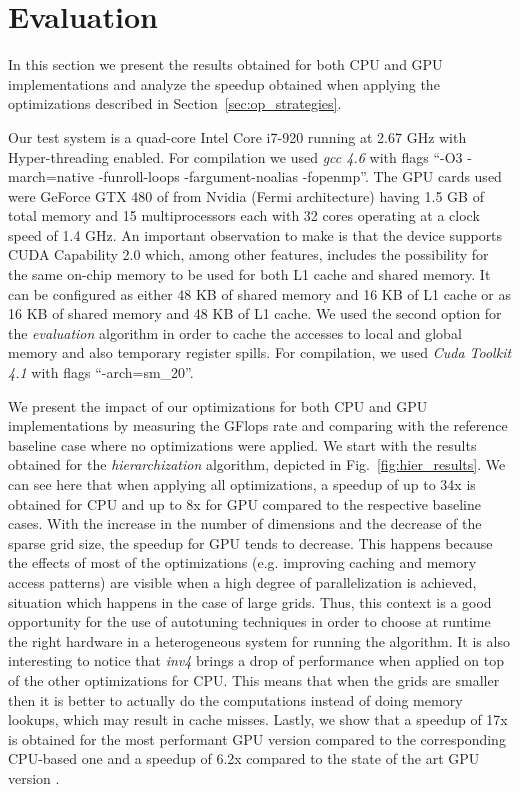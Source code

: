 \section{Evaluation}

In this section we present the results obtained for both CPU and GPU
implementations and analyze the speedup obtained when applying the
optimizations described in Section~\ref{sec:op_strategies}.

Our test system is a quad-core Intel Core i7-920 running at 2.67 GHz with
Hyper-threading enabled. For compilation we used \textit{gcc 4.6} with flags
``-O3 -march=native -funroll-loops -fargument-noalias -fopenmp''. The GPU cards
used were GeForce GTX 480 of from Nvidia (Fermi architecture) having 1.5 GB of
total memory and 15 multiprocessors each with 32 cores operating at a clock
speed of 1.4 GHz. An important observation to make is that the device supports
CUDA Capability 2.0 which, among other features, includes the possibility for
the same on-chip memory to be used for both L1 cache and shared memory. It can
be configured as either 48 KB of shared memory and 16 KB of L1 cache or as 16 KB
of shared memory and 48 KB of L1 cache. We used the second option for the
\textit{evaluation} algorithm in order to cache the accesses to local and global
memory and also temporary register spills. For compilation, we used
\textit{Cuda Toolkit 4.1} with flags ``-arch=sm\_20''.

We present the impact of our optimizations for both CPU and GPU implementations
by measuring the GFlops rate and comparing with the reference baseline case
where no optimizations were applied. We start with the results obtained for the
\textit{hierarchization} algorithm, depicted in Fig.~\ref{fig:hier_results}. We
can see here that when applying all optimizations, a speedup of up to 34x is
obtained for CPU and up to 8x for GPU compared to the respective baseline cases.
With the increase in the number of dimensions and the decrease of the sparse
grid size, the speedup for GPU tends to decrease. This happens because the
effects of most of the optimizations (e.g. improving caching and memory access
patterns) are visible when a high degree of parallelization is achieved,
situation which happens in the case of large grids. Thus, this context is a good
opportunity for the use of autotuning techniques in order to choose at runtime
the right hardware in a heterogeneous system for running the algorithm. It is
also interesting to notice that \textit{inv4} brings a drop of performance when
applied on top of the other optimizations for CPU. This means that when the
grids are smaller then it is better to actually do the computations instead of
doing memory lookups, which may result in cache misses. Lastly, we show that a
speedup of 17x is obtained for the most performant GPU version compared to the
corresponding CPU-based one and a speedup of 6.2x compared to the state of the
art GPU version \cite{murarasu2011}.

